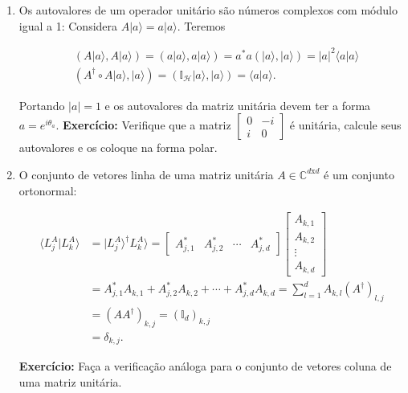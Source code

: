 \documentclass[11pt]{article}
\providecommand{\tightlist}{%
      \setlength{\itemsep}{0pt}\setlength{\parskip}{0pt}}
\begin{document}
\begin{enumerate}
\def\labelenumi{\arabic{enumi}.}
\setcounter{enumi}{1}
\tightlist
\item
  Os autovalores de um operador unitário são números complexos com
  módulo igual a 1: Considera \(A|a\rangle=a|a\rangle\). Teremos

  \begin{align}
  & (A|a\rangle,A|a\rangle) = (a|a\rangle,a|a\rangle) = a^{*}a(|a\rangle,|a\rangle) = |a|^{2}\langle a|a\rangle \\ 
  & (A^{\dagger}\circ A|a\rangle,|a\rangle) = (\mathbb{I}_{\mathcal{H}}|a\rangle,|a\rangle) = \langle a|a\rangle.
  \end{align}

  Portando \(|a|=1\) e os autovalores da matriz unitária devem ter a
  forma \(a=e^{i\theta_{a}}\). \textbf{Exercício:} Verifique que a
  matriz \(\begin{bmatrix} 0 & -i \\ i & 0 \end{bmatrix}\) é unitária,
  calcule seus autovalores e os coloque na forma polar.
\item
  O conjunto de vetores linha de uma matriz unitária
  \(A\in\mathbb{C}^{d\text{x}d}\) é um conjunto ortonormal:

  \begin{align}
  \langle L_{j}^{A}|L_{k}^{A}\rangle & = |L_{j}^{A}\rangle^{\dagger}L_{k}^{A}\rangle  = \begin{bmatrix}A_{j,1}^{*} & A_{j,2}^{*} & \cdots & A_{j,d}^{*}\end{bmatrix}\begin{bmatrix}A_{k,1} \\ A_{k,2} \\ \vdots \\ A_{k,d}\end{bmatrix} \\
  & = A_{j,1}^{*}A_{k,1}+A_{j,2}^{*}A_{k,2}+\cdots+A_{j,d}^{*}A_{k,d} = \sum_{l=1}^{d}A_{k,l}(A^{\dagger})_{l,j} \\
  & = (AA^{\dagger})_{k,j} = (\mathbb{I}_{d})_{k,j} \\
  & = \delta_{k,j}.
  \end{align}

  \textbf{Exercício:} Faça a verificação análoga para o conjunto de
  vetores coluna de uma matriz unitária.
\end{enumerate}


    
    
    
    
\end{document}
